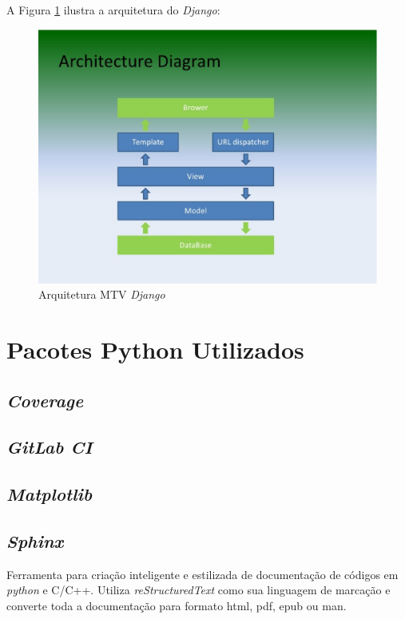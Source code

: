 A Figura \ref{django-arq} ilustra a arquitetura do \textit{Django}:

\begin{figure}[h]
    \centering
    \includegraphics[keepaspectratio=true,scale=0.5]{figuras/django-arquitetura.eps}
    \caption{Arquitetura MTV \textit{Django}}
    \label{django-arq}
\end{figure}

\section{Pacotes Python Utilizados}
    \subsection{\textit{Coverage}}

    \subsection{\textit{GitLab CI}}

    \subsection{\textit{Matplotlib}}

    \subsection{\textit{Sphinx}}
    Ferramenta para criação inteligente e estilizada de documentação de códigos em \textit{python} e C/C++. Utiliza \textit{reStructuredText} como sua linguagem de marcação e converte toda a documentação
    para formato html, pdf, epub ou man.
